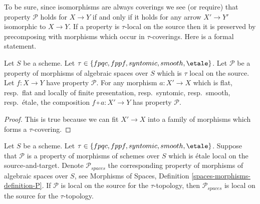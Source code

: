 \noindent
To be sure, since isomorphisms are always coverings
we see (or require) that property $\mathcal{P}$ holds for $X \to Y$
if and only if it holds for any arrow $X' \to Y'$ isomorphic to $X \to Y$.
If a property is $\tau$-local on the source then it is preserved by
precomposing with morphisms which occur in $\tau$-coverings. Here
is a formal statement.

\begin{lemma}
\label{lemma-precompose-property-local-source}
Let $S$ be a scheme.
Let $\tau \in \{fpqc, \linebreak[0] fppf, \linebreak[0] syntomic, \linebreak[0]
smooth, \linebreak[0] \etale\}$.
Let $\mathcal{P}$ be a property of morphisms of algebraic spaces over $S$
which is $\tau$ local on the source. Let $f : X \to Y$ have property
$\mathcal{P}$. For any morphism $a : X' \to X$ which is
flat, resp.\ flat and locally of finite presentation, resp.\ syntomic,
resp.\ smooth, resp.\ \'etale, the composition $f \circ a : X' \to Y$ has
property $\mathcal{P}$.
\end{lemma}

\begin{proof}
This is true because we can fit $X' \to X$ into a family of
morphisms which forms a $\tau$-covering.
\end{proof}

\begin{lemma}
\label{lemma-transfer-from-schemes}
Let $S$ be a scheme.
Let $\tau \in \{fpqc, \linebreak[0] fppf, \linebreak[0] syntomic, \linebreak[0]
smooth, \linebreak[0] \etale\}$.
Suppose that $\mathcal{P}$ is a property of morphisms of schemes over $S$
which is \'etale local on the source-and-target. Denote $\mathcal{P}_{spaces}$
the corresponding property of morphisms of algebraic spaces over $S$, see
Morphisms of Spaces, Definition \ref{spaces-morphisms-definition-P}.
If $\mathcal{P}$ is local on the source for the $\tau$-topology, then
$\mathcal{P}_{spaces}$ is local on the source for the $\tau$-topology.
\end{lemma}

